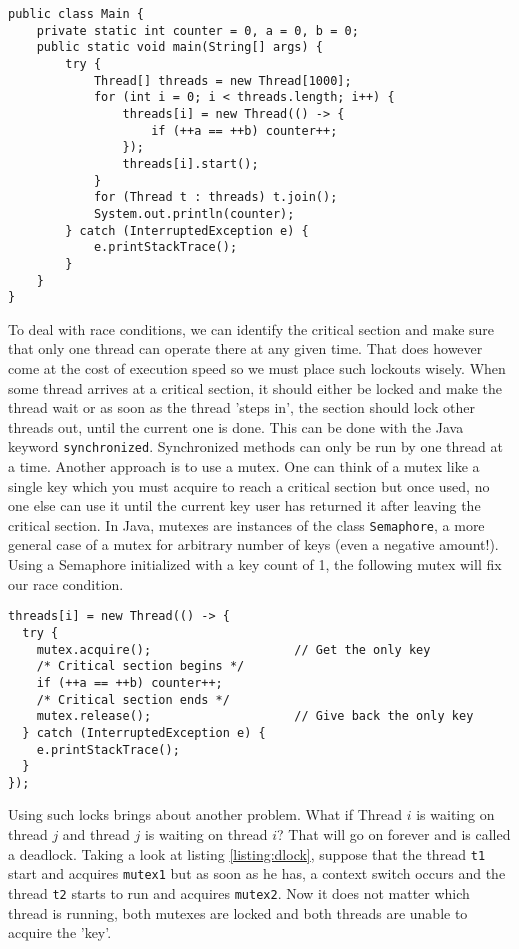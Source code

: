 \begin{lstlisting}[style=A_Java, caption={Race condition}, label={listing:rcon}]
public class Main {
    private static int counter = 0, a = 0, b = 0;
    public static void main(String[] args) {
        try {
            Thread[] threads = new Thread[1000];
            for (int i = 0; i < threads.length; i++) {
                threads[i] = new Thread(() -> {
                    if (++a == ++b) counter++;
                });
                threads[i].start();
            }
            for (Thread t : threads) t.join();
            System.out.println(counter);
        } catch (InterruptedException e) {
            e.printStackTrace();
        }
    }
}
\end{lstlisting}

To deal with race conditions, we can identify the critical section and make sure that only one thread can operate there at any given time. That does however come at the cost of execution speed so we must place such lockouts wisely. When some thread arrives at a critical section, it should either be locked and make the thread wait or as soon as the thread 'steps in', the section should lock other threads out, until the current one is done. This can be done with the Java keyword \verb!synchronized!. Synchronized methods can only be run by one thread at a time. Another approach is to use a mutex. One can think of a mutex like a single key which you must acquire to reach a critical section but once used, no one else can use it until the current key user has returned it after leaving the critical section. In Java, mutexes are instances of the class \texttt{Semaphore}, a more general case of a mutex for arbitrary number of keys (even a negative amount!). Using a Semaphore initialized with a key count of 1, the following mutex will fix our race condition.

\begin{lstlisting}[style=A_Java]
threads[i] = new Thread(() -> {
  try {
    mutex.acquire();                    // Get the only key
    /* Critical section begins */
    if (++a == ++b) counter++;
    /* Critical section ends */
    mutex.release();                    // Give back the only key
  } catch (InterruptedException e) {
    e.printStackTrace();
  }
});
\end{lstlisting}

Using such locks brings about another problem. What if Thread $i$ is waiting on thread $j$ and thread $j$ is waiting on thread $i$? That will go on forever and is called a deadlock. Taking a look at listing \ref{listing:dlock}, suppose that the thread \texttt{t1} start and acquires \texttt{mutex1} but as soon as he has, a context switch occurs and the thread \texttt{t2} starts to run and acquires \texttt{mutex2}. Now it does not matter which thread is running, both mutexes are locked and both threads are unable to acquire the 'key'.

